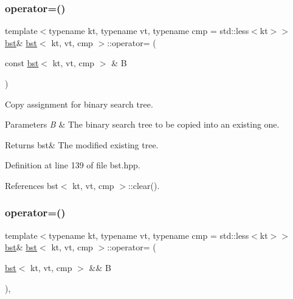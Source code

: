 \subsubsection{\texorpdfstring{operator=()}{operator=()}\hspace{0.1cm}{\footnotesize\ttfamily [1/2]}}
{\footnotesize\ttfamily template$<$typename kt, typename vt, typename cmp = std\+::less$<$kt$>$$>$ \\
\hyperlink{classbst}{bst}\& \hyperlink{classbst}{bst}$<$ kt, vt, cmp $>$\+::operator= (\begin{DoxyParamCaption}\item[{const \hyperlink{classbst}{bst}$<$ kt, vt, cmp $>$ \&}]{B }\end{DoxyParamCaption})\hspace{0.3cm}{\ttfamily [inline]}}



Copy assignment for binary search tree. 


\begin{DoxyParams}{Parameters}
{\em B} & The binary search tree to be copied into an existing one. \\
\hline
\end{DoxyParams}
\begin{DoxyReturn}{Returns}
bst\& The modified existing tree. 
\end{DoxyReturn}


Definition at line 139 of file bst.\+hpp.



References bst$<$ kt, vt, cmp $>$\+::clear().

\mbox{\label{classbst_a3e595b50a147f3c6fe64f1b1514c539d}} 
\subsubsection{\texorpdfstring{operator=()}{operator=()}\hspace{0.1cm}{\footnotesize\ttfamily [2/2]}}
{\footnotesize\ttfamily template$<$typename kt, typename vt, typename cmp = std\+::less$<$kt$>$$>$ \\
\hyperlink{classbst}{bst}\& \hyperlink{classbst}{bst}$<$ kt, vt, cmp $>$\+::operator= (\begin{DoxyParamCaption}\item[{\hyperlink{classbst}{bst}$<$ kt, vt, cmp $>$ \&\&}]{B }\end{DoxyParamCaption})\hspace{0.3cm}{\ttfamily [inline]}, {\ttfamily [noexcept]}}



